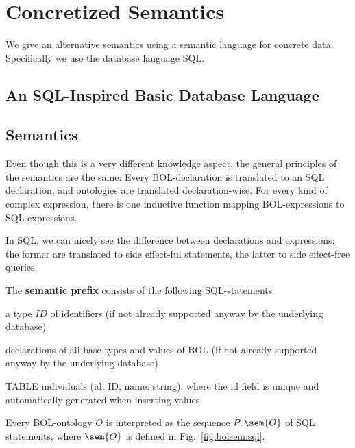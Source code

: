\section{Concretized Semantics}\label{sec:bolsem:conc}

We give an alternative semantics using a semantic language for concrete data.
Specifically we use the database language SQL.

\subsection{An SQL-Inspired Basic Database Language}\label{sec:wuv:bdl}
  

\subsection{Semantics}

Even though this is a very different knowledge aspect, the general principles of the semantics are the same:
Every BOL-declaration is translated to an SQL declaration, and ontologies are translated declaration-wise.
For every kind of complex expression, there is one inductive function mapping BOL-expressions to SQL-expressions.

In SQL, we can nicely see the difference between declarations and expressions: the former are translated to side effect-ful statements, the latter to side effect-free queries.

\begin{definition}\label{def:bolsem:sql}
The \textbf{semantic prefix} consists of the following SQL-statements
\begin{compactitem}
 \item a type $ID$ of identifiers (if not already supported anyway by the underlying database)
 \item declarations of all base types and values of BOL (if not already supported anyway by the underlying database)
 \item TABLE individuals (id: ID, name: string), where the id field is unique and automatically generated when inserting values
\end{compactitem}

Every BOL-ontology $O$ is interpreted as the sequence $P,\sem{O}$ of SQL statements, where $\sem{O}$ is defined in Fig.~\ref{fig:bolsem:sql}.
\end{definition}

